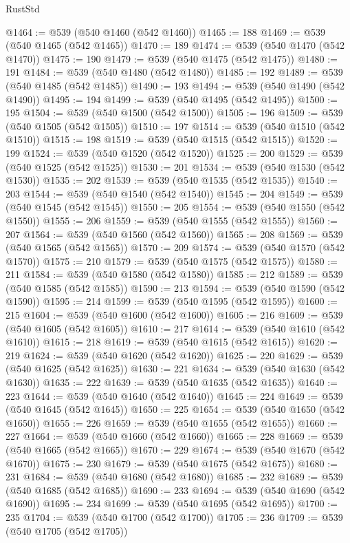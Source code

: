 \begin{lexlean}{RustStd}
\begin{coremodule}
@1464 := @539 (@540 @1460 (@542 @1460))
@1465 := 188
@1469 := @539 (@540 @1465 (@542 @1465))
@1470 := 189
@1474 := @539 (@540 @1470 (@542 @1470))
@1475 := 190
@1479 := @539 (@540 @1475 (@542 @1475))
@1480 := 191
@1484 := @539 (@540 @1480 (@542 @1480))
@1485 := 192
@1489 := @539 (@540 @1485 (@542 @1485))
@1490 := 193
@1494 := @539 (@540 @1490 (@542 @1490))
@1495 := 194
@1499 := @539 (@540 @1495 (@542 @1495))
@1500 := 195
@1504 := @539 (@540 @1500 (@542 @1500))
@1505 := 196
@1509 := @539 (@540 @1505 (@542 @1505))
@1510 := 197
@1514 := @539 (@540 @1510 (@542 @1510))
@1515 := 198
@1519 := @539 (@540 @1515 (@542 @1515))
@1520 := 199
@1524 := @539 (@540 @1520 (@542 @1520))
@1525 := 200
@1529 := @539 (@540 @1525 (@542 @1525))
@1530 := 201
@1534 := @539 (@540 @1530 (@542 @1530))
@1535 := 202
@1539 := @539 (@540 @1535 (@542 @1535))
@1540 := 203
@1544 := @539 (@540 @1540 (@542 @1540))
@1545 := 204
@1549 := @539 (@540 @1545 (@542 @1545))
@1550 := 205
@1554 := @539 (@540 @1550 (@542 @1550))
@1555 := 206
@1559 := @539 (@540 @1555 (@542 @1555))
@1560 := 207
@1564 := @539 (@540 @1560 (@542 @1560))
@1565 := 208
@1569 := @539 (@540 @1565 (@542 @1565))
@1570 := 209
@1574 := @539 (@540 @1570 (@542 @1570))
@1575 := 210
@1579 := @539 (@540 @1575 (@542 @1575))
@1580 := 211
@1584 := @539 (@540 @1580 (@542 @1580))
@1585 := 212
@1589 := @539 (@540 @1585 (@542 @1585))
@1590 := 213
@1594 := @539 (@540 @1590 (@542 @1590))
@1595 := 214
@1599 := @539 (@540 @1595 (@542 @1595))
@1600 := 215
@1604 := @539 (@540 @1600 (@542 @1600))
@1605 := 216
@1609 := @539 (@540 @1605 (@542 @1605))
@1610 := 217
@1614 := @539 (@540 @1610 (@542 @1610))
@1615 := 218
@1619 := @539 (@540 @1615 (@542 @1615))
@1620 := 219
@1624 := @539 (@540 @1620 (@542 @1620))
@1625 := 220
@1629 := @539 (@540 @1625 (@542 @1625))
@1630 := 221
@1634 := @539 (@540 @1630 (@542 @1630))
@1635 := 222
@1639 := @539 (@540 @1635 (@542 @1635))
@1640 := 223
@1644 := @539 (@540 @1640 (@542 @1640))
@1645 := 224
@1649 := @539 (@540 @1645 (@542 @1645))
@1650 := 225
@1654 := @539 (@540 @1650 (@542 @1650))
@1655 := 226
@1659 := @539 (@540 @1655 (@542 @1655))
@1660 := 227
@1664 := @539 (@540 @1660 (@542 @1660))
@1665 := 228
@1669 := @539 (@540 @1665 (@542 @1665))
@1670 := 229
@1674 := @539 (@540 @1670 (@542 @1670))
@1675 := 230
@1679 := @539 (@540 @1675 (@542 @1675))
@1680 := 231
@1684 := @539 (@540 @1680 (@542 @1680))
@1685 := 232
@1689 := @539 (@540 @1685 (@542 @1685))
@1690 := 233
@1694 := @539 (@540 @1690 (@542 @1690))
@1695 := 234
@1699 := @539 (@540 @1695 (@542 @1695))
@1700 := 235
@1704 := @539 (@540 @1700 (@542 @1700))
@1705 := 236
@1709 := @539 (@540 @1705 (@542 @1705))

\end{coremodule}
\end{lexlean}
